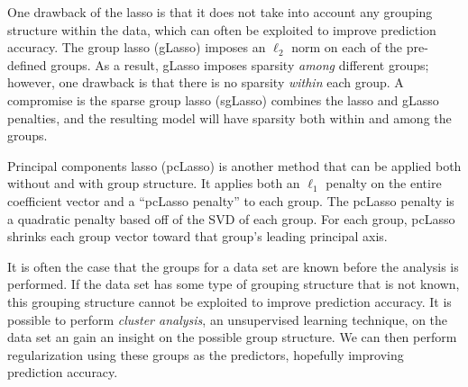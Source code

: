 \documentclass[10pt]{article}
\begin{document}
One drawback of the lasso is that it does not take into account any grouping structure within the data, which can often be exploited to improve prediction accuracy. The group lasso (gLasso) \cite{yuan2006model} imposes an $\ell_2$ norm on each of the pre-defined groups. As a result, gLasso imposes sparsity \textit{among} different groups; however, one drawback is that there is no sparsity \textit{within} each group. A compromise is the sparse group lasso (sgLasso) \cite{friedman2010note} combines the lasso and gLasso penalties, and the resulting model will have sparsity both within and among the groups. %

Principal components lasso (pcLasso) \cite{2018arXiv181004651T} is another method that can be applied both without and with group structure. It applies both an $\ell_1$ penalty on the entire coefficient vector and a ``pcLasso penalty'' to each group. The pcLasso penalty is a quadratic penalty based off of the SVD of each group. For each group, pcLasso shrinks each group vector toward that group's leading principal axis. %

It is often the case that the groups for a data set are known before the analysis is performed. If the data set has some type of grouping structure that is not known, this grouping structure cannot be exploited to improve prediction accuracy. It is possible to perform \textit{cluster analysis}, an unsupervised learning technique, on the data set an gain an insight on the possible group structure. We can then perform regularization using these groups as the predictors, hopefully improving prediction accuracy. 
\end{document}
